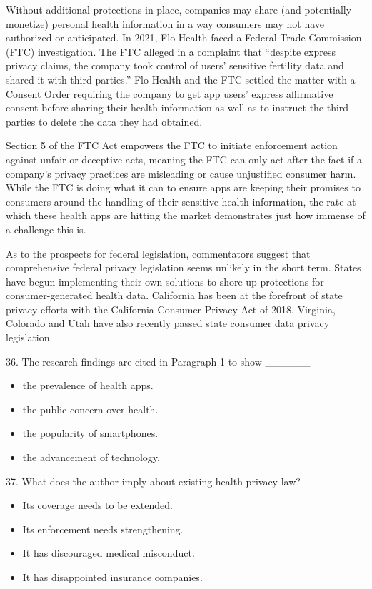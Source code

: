 \documentclass[UTF8,11pt]{ctexart}
\begin{document}
Without additional protections in place, companies may share (and potentially monetize) personal health information in a way consumers may not have authorized or anticipated. In 2021, Flo Health faced a Federal Trade Commission (FTC) investigation. The FTC alleged in a complaint that “despite express privacy claims, the company took control of users’ sensitive fertility data and shared it with third parties.” Flo Health and the FTC settled the matter with a Consent Order requiring the company to get app users’ express affirmative consent before sharing their health information as well as to instruct the third parties to delete the data they had obtained.


Section 5 of the FTC Act empowers the FTC to initiate enforcement action against unfair or deceptive acts, meaning the FTC can only act after the fact if a company’s privacy practices are misleading or cause unjustified consumer harm. While the FTC is doing what it can to ensure apps are keeping their promises to consumers around the handling of their sensitive health information, the rate at which these health apps are hitting the market demonstrates just how immense of a challenge this is.


As to the prospects for federal legislation, commentators suggest that comprehensive federal privacy legislation seems unlikely in the short term. States have begun implementing their own solutions to shore up protections for consumer-generated health data. California has been at the forefront of state privacy efforts with the California Consumer Privacy Act of 2018. Virginia, Colorado and Utah have also recently passed state consumer data privacy legislation.


36. The research findings are cited in Paragraph 1 to show \_\_\_\_\_\_


\begin{itemize}[leftmargin=2em,itemsep=.2em,topsep=.4em]\item[A.] the prevalence of health apps.
\item[B.] the public concern over health.
\item[C.] the popularity of smartphones.
\item[D.] the advancement of technology.
\end{itemize}

37. What does the author imply about existing health privacy law?


\begin{itemize}[leftmargin=2em,itemsep=.2em,topsep=.4em]\item[A.] Its coverage needs to be extended.
\item[B.] Its enforcement needs strengthening.
\item[C.] It has discouraged medical misconduct.
\item[D.] It has disappointed insurance companies.
\end{itemize}
\end{document}
